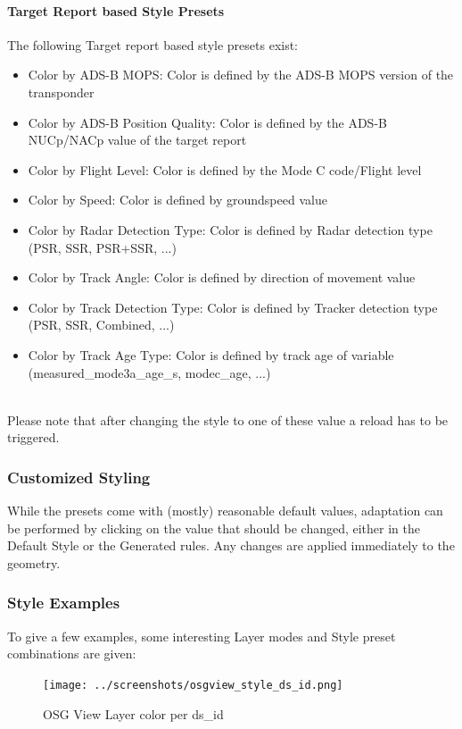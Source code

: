 \paragraph{Target Report based Style Presets}
The following Target report based style presets exist:
\begin{itemize}
 \item Color by ADS-B MOPS: Color is defined by the ADS-B MOPS version of the transponder
 \item Color by ADS-B Position Quality: Color is defined by the ADS-B NUCp/NACp value of the target report
 \item Color by Flight Level: Color is defined by the Mode C code/Flight level
 \item Color by Speed: Color is defined by groundspeed value
 \item Color by Radar Detection Type: Color is defined by Radar detection type (PSR, SSR, PSR+SSR, ...)
 \item Color by Track Angle: Color is defined by direction of movement value
 \item Color by Track Detection Type: Color is defined by Tracker detection type (PSR, SSR, Combined, ...)
 \item Color by Track Age Type: Color is defined by track age of variable (measured\_mode3a\_age\_s, modec\_age, ...)
\end{itemize}
\  \\

Please note that after changing the style to one of these value a reload has to be triggered. \\

\subsubsection{Customized Styling}

While the presets come with (mostly) reasonable default values, adaptation can be performed by clicking on the value that should be changed, either in the Default Style or the Generated rules. Any changes are applied immediately to the geometry.

\subsubsection{Style Examples}

To give a few examples, some interesting Layer modes and Style preset combinations are given:

\begin{figure}[H]
    \hspace*{-2.5cm}
    \texttt{[image: ../screenshots/osgview\_style\_ds\_id.png]}
  \caption{OSG View Layer color per ds\_id}
\end{figure}

